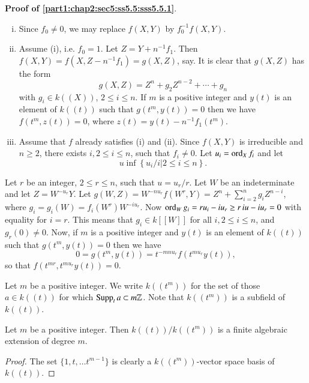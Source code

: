 \noindent \textbf{Proof of \ref{part1:chap2:sec5:ss5.5:sss5.5.1}}.

\begin{enumerate}[(i)]
\item Since $f_0 \neq 0$, we may replace $f(X, Y)$ by $f^{-1}_0 f(X, Y)$.
\item Assume (i), i.e. $f_0 =1$. Let $Z= Y + n^{-1} f_1$. Then $f(X, Y)= f(X, Z-n^{-1} f_1)= g(X, Z)$, say. It is clear that $g(X, Z)$ has the form
$$
g(X, Z)= Z^n + g_2 Z^{n-2} + \cdots + g_n
$$
with $g_i \in k ((X))$, $2 \leq i \leq n$. If $m$ is a positive integer and $y(t)$ is an element of $k((t))$ such that $g(t^m, y(t))=0$ then we have $f(t^m, z(t))=0$, where $z(t) = y(t) - n^{-1}f_1 (t^m)$.
\item Assume that $f$ already satisfies (i) and (ii). Since $f(X, Y)$ is irreducible and $n \geq 2$, there exists $i, 2 \leq i \leq n$, such that $f_i \neq 0$. Let $u_i = \operatorname{ord}_X f_i$ and let
$$
u \inf \left\{ u_i /i \Big| 2 \leq i \leq n \right\}.
$$
\end{enumerate}

Let $r$ be an integer, $2 \leq r \leq n$, such that $u= u_r/r$. Let $W$ be an indeterminate and let $Z= W^{-u_r} Y$. Let $g(W, Z)= W^{-nu_r} f(W^r, Y)= Z^n+ \sum^n_{i=2} g_i Z^{n-i}$, where $g_i = g_i (W) = f_i (W^r) W^{-iu_r}$. Now $\operatorname{ord}_W g_i = ru_i - iu_r \geq r \, iu- iu_r =0$ with equality for $i=r$. This means that $g_i \in k [[W]]$ for all $i, 2 \leq i \leq n$, and $g_r (0) \neq 0$. Now, if $m$ is a positive integer and $y(t)$ is an element of $k((t))$ such that $g(t^m, y(t))=0$ then we have
$$
0 = g(t^m, y(t))=t^{-mnu_r} f(t^{mu_r} y(t)),
$$
so that $f(t^{mr}, t^{mu_r} y(t))=0$.

\setcounter{thm}{5}
\begin{notn}\label{part1:chap2:sec5:notn5.6}
  Let $m$ be a positive integer. We write $k((t^m))$ for the set of those $a\in k ((t))$ for which $\operatorname{Supp}_t a \subset m \mathbb{Z}$. Note that $k((t^m))$ is a subfield of\pageoriginale $k((t))$.
\end{notn}

\begin{lemma}\label{part1:chap2:sec5:lem5.7}
  Let $m$ be a positive integer. Then $k((t))/k((t^m))$ is a finite algebraic extension of degree $m$.
\end{lemma}

\begin{proof}
  The set $\{ 1, t, \ldots t^{m-1} \}$ is clearly a $k((t^m))$-vector space basis of $k((t))$.
\end{proof}

